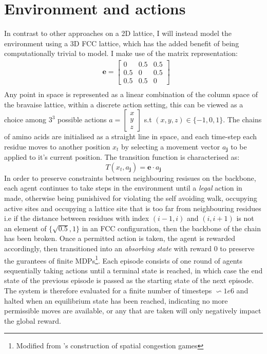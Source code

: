 \section{Environment and actions}
In contrast to other approaches on a 2D lattice, I will instead 
model the environment using a 3D FCC lattice, which has the added benefit of
being computationally trivial to model. I make use of the
matrix representation:
\begin{equation}
    \begin{split}
        & \mathbf{e} = \begin{bmatrix}
            0 & 0.5 & 0.5 \\
            0.5 & 0 & 0.5 \\
            0.5 & 0.5 & 0
        \end{bmatrix} \\
    \end{split}
\end{equation}
Any point in space is represented as a linear combination of the
column space of the bravaise lattice, within a discrete action setting,
this can be viewed as a choice among $3^3$ possible actions $ a = \begin{bmatrix}
    x \\ y \\ z
\end{bmatrix}$ s.t $(x,y,z) \in \{-1,0,1 \}$.
The chains of amino acids are initialised as a straight line in space, and each
time-step each residue moves to another position $x_t$ by selecting a movement vector
$a_{\mathbf{j}}$ to be applied to it's current position. The transition function
is characterised as:
\begin{equation}
    T(x_t, a_{\mathbf{j}}) =\mathbf{e} \cdot a_{\mathbf{j}}
\end{equation}
In order to preserve constraints between neighbouring resisues on the backbone, each agent
continues to take steps in the environment until a \emph{legal} action in made, otherwise
being punishived for violating the self avoiding walk, occupying active sites and occupying a lattice site that is 
too far from neighbouring residues i.e if the distance between residues with index $(i-1, i)$
and $(i, i+1)$ is not an element of $\{\sqrt{0.5}, 1\}$ in an FCC configuration, then the backbone
of the chain has been broken. Once a permitted action is taken, the agent is rewarded accordingly,
then transitioned into an \emph{absorbing state} with reward 0 to preserve the gurantees of finite MDPs\footnote{Modified from \cite{Mguni2018}'s construction of spatial congestion games}.
Each episode consists of one round of agents sequentially taking actions until a terminal state is reached,
in which case the end state of the previous episode is passed as the starting state of the next episode. The
system is therefore evaluated for a finite number of timesteps $\backsim 1e6$ and halted when an equilibrium
state has been reached, indicating no more permissible moves are available, or any that are taken will only negatively
impact the global reward.
